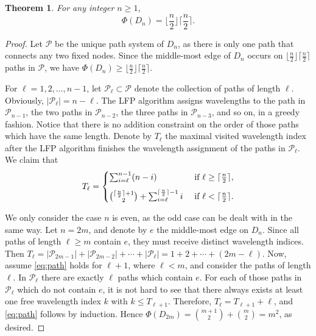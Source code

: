 \documentclass[journal,draftcls,onecolumn,12pt,twoside]{IEEEtran}
\newtheorem{theorem}{\bf Theorem}
\begin{document}
\begin{theorem}\label{thm:path}
For any integer $n\geq 1$,
$$\Phi(D_n)=\Big\lfloor\frac{n}{2}\Big\rfloor \Big\lceil\frac{n}{2}\Big\rceil.
$$
\end{theorem}
\begin{proof}
Let $\mathcal{P}$ be the unique path system of $D_n$, as there is only one path that connects any two fixed nodes.
Since the middle-most edge of $D_n$ occurs on $\lfloor\frac{n}{2}\rfloor \lceil\frac{n}{2}\rceil$ paths in $\mathcal{P}$, we have $\Phi(D_n)\geq\lfloor\frac{n}{2}\rfloor \lceil\frac{n}{2}\rceil$.

For $\ell=1,2,\ldots,n-1$, let $\mathcal{P}_{\ell}\subset\mathcal{P}$ denote the collection of paths of length $\ell$.
Obviously, $|\mathcal{P}_{\ell}|=n-\ell$.
The LFP algorithm assigns wavelengths to the path in $\mathcal{P}_{n-1}$, the two paths in $\mathcal{P}_{n-2}$, the three paths in $\mathcal{P}_{n-3}$, and so on, in a greedy fashion.
Notice that there is no addition constraint on the order of those paths which have the same length.
Denote by $T_{\ell}$ the maximal visited wavelength index after the LFP algorithm finishes the wavelength assignment of the paths in $\mathcal{P}_{\ell}$.
We claim that 
\begin{equation}\label{eq:path}
T_{\ell} = \begin{cases}
\sum_{i=\ell}^{n-1} (n-i) & \text{ if } \ell\geq\lceil\frac{n}{2}\rceil, \vspace*{7pt} \\ 
{\lceil\frac{n}{2}\rceil+1 \choose 2} + \sum_{i=\ell}^{\lceil\frac{n}{2}\rceil-1}i & \text{ if } \ell < \lceil\frac{n}{2}\rceil.
\end{cases}
\end{equation}

We only consider the case $n$ is even, as the odd case can be dealt with in the same way.
Let $n=2m$, and denote by $e$ the middle-most edge on $D_n$.
Since all paths of length $\ell\geq m$ contain $e$, they must receive distinct wavelength indices.
Then $T_\ell=|\mathcal{P}_{2m-1}|+|\mathcal{P}_{2m-2}|+\cdots+|\mathcal{P}_{\ell}|=1+2+\cdots+(2m-\ell)$.
Now, assume \eqref{eq:path} holds for $\ell+1$, where $\ell<m$, and consider the paths of length $\ell$.
In $\mathcal{P}_{\ell}$ there are exactly $\ell$ paths which contain $e$.
For each of those paths in $\mathcal{P}_{\ell}$ which do not contain $e$, it is not hard to see that there always exists at least one free wavelength index $k$ with $k\leq T_{\ell+1}$.
Therefore, $T_{\ell}=T_{\ell+1}+\ell$, and \eqref{eq:path} follows by induction.
Hence $\Phi(D_{2m})={m+1\choose 2}+{m\choose 2}=m^2$, as desired.
\end{proof}
\end{document}
